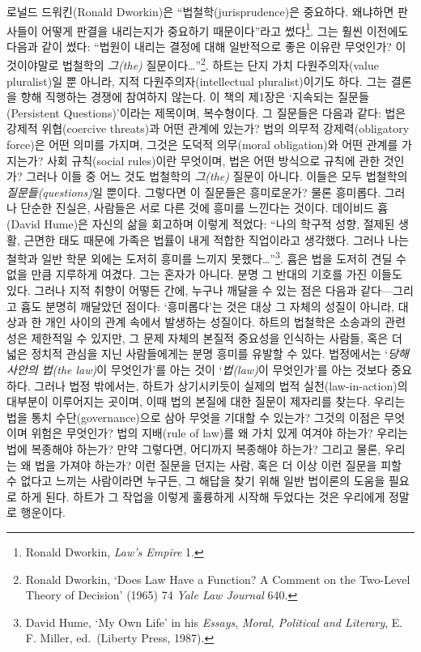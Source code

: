 \documentclass[12pt, oneside]{book}  %
\begin{document}
로널드 드워킨(Ronald Dworkin)은 ``법철학(jurisprudence)은 중요하다.
왜냐하면 판사들이 어떻게 판결을 내리는지가 중요하기 때문이다''라고
썼다\footnote{Ronald Dworkin, \emph{Law's Empire} 1.}. 그는 훨씬
이전에도 다음과 같이 썼다: ``법원이 내리는 결정에 대해 일반적으로 좋은
이유란 무엇인가? 이것이야말로 법철학의 \emph{그(the)}
질문이다\ldots{}''\footnote{Ronald Dworkin, `Does Law Have a Function? A
  Comment on the Two-Level Theory of Decision' (1965) 74 \emph{Yale Law
  Journal} 640.}. 하트는 단지 가치 다원주의자(value pluralist)일 뿐
아니라, 지적 다원주의자(intellectual pluralist)이기도 하다. 그는 결론을
향해 직행하는 경쟁에 참여하지 않는다. 이 책의 제1장은 `지속되는
질문들(Persistent Questions)'이라는 제목이며, 복수형이다. 그 질문들은
다음과 같다: 법은 강제적 위협(coercive threats)과 어떤 관계에 있는가?
법의 의무적 강제력(obligatory force)은 어떤 의미를 가지며, 그것은 도덕적
의무(moral obligation)와 어떤 관계를 가지는가? 사회 규칙(social
rules)이란 무엇이며, 법은 어떤 방식으로 규칙에 관한 것인가? 그러나 이들
중 어느 것도 법철학의 \emph{그(the)} 질문이 아니다. 이들은 모두 법철학의
\emph{질문들(questions)}일 뿐이다. 그렇다면 이 질문들은 흥미로운가? 물론
흥미롭다. 그러나 단순한 진실은, 사람들은 서로 다른 것에 흥미를 느낀다는
것이다. 데이비드 흄(David Hume)은 자신의 삶을 회고하며 이렇게 적었다:
``나의 학구적 성향, 절제된 생활, 근면한 태도 때문에 가족은 법률이 내게
적합한 직업이라고 생각했다. 그러나 나는 철학과 일반 학문 외에는 도저히
흥미를 느끼지 못했다\ldots{}''\footnote{David Hume, `My Own Life' in his
  \emph{Essays}, \emph{Moral, Political and Literary}, E. F. Miller,
  ed.~(Liberty Press, 1987).}. 흄은 법을 도저히 견딜 수 없을 만큼
지루하게 여겼다. 그는 혼자가 아니다. 분명 그 반대의 기호를 가진 이들도
있다. 그러나 지적 취향이 어떻든 간에, 누구나 깨달을 수 있는 점은 다음과
같다---그리고 흄도 분명히 깨달았던 점이다: `흥미롭다'는 것은 대상 그
자체의 성질이 아니라, 대상과 한 개인 사이의 관계 속에서 발생하는
성질이다. 하트의 법철학은 소송과의 관련성은 제한적일 수 있지만, 그 문제
자체의 본질적 중요성을 인식하는 사람들, 혹은 더 넓은 정치적 관심을 지닌
사람들에게는 분명 흥미를 유발할 수 있다. 법정에서는 `\emph{당해 사안의
법(the law)}이 무엇인가'를 아는 것이 `\emph{법(law)}이 무엇인가'를 아는
것보다 중요하다. 그러나 법정 밖에서는, 하트가 상기시키듯이 실제의 법적
실천(law-in-action)의 대부분이 이루어지는 곳이며, 이때 법의 본질에 대한
질문이 제자리를 찾는다. 우리는 법을 통치 수단(governance)으로 삼아
무엇을 기대할 수 있는가? 그것의 이점은 무엇이며 위험은 무엇인가? 법의
지배(rule of law)를 왜 가치 있게 여겨야 하는가? 우리는 법에 복종해야
하는가? 만약 그렇다면, 어디까지 복종해야 하는가? 그리고 물론, 우리는 왜
법을 가져야 하는가? 이런 질문을 던지는 사람, 혹은 더 이상 이런 질문을
피할 수 없다고 느끼는 사람이라면 누구든, 그 해답을 찾기 위해 일반
법이론의 도움을 필요로 하게 된다. 하트가 그 작업을 이렇게 훌륭하게
시작해 두었다는 것은 우리에게 정말로 행운이다.  %
\end{document}
